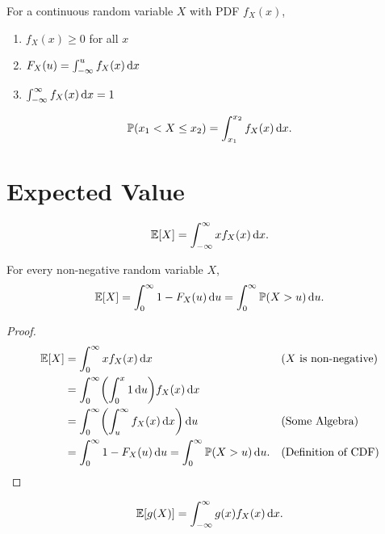 \begin{theorem}
    For a continuous random variable $X$ with \textnormal{PDF} $f_X(x)$,
    \begin{enumerate}
        \item $f_X(x)\geq 0$ for all $x$
        \item $F_X(u)=\int_{-\infty}^u f_X(x)\mathop{}\!\mathrm{d} x$
        \item $\int_{-\infty}^{\infty} f_X(x)\mathop{}\!\mathrm{d} x = 1$
    \end{enumerate}
\end{theorem}

\begin{theorem}
    \begin{align*}
        \P{x_1<X\leq x_2}=\int_{x_1}^{x_2}f_X(x)\diff x.
    \end{align*}
\end{theorem}


\section{Expected Value}
\begin{definition}
    \begin{align*}
        \E{X}=\int_{-\infty}^{\infty} xf_X(x) \diff x.
    \end{align*}
\end{definition}

\begin{theorem}
    For every non-negative random variable $X$, \[\E{X}=\int_{0}^{\infty}1-F_X(u)\diff u=\int_{0}^{\infty}\P{X>u}\diff u.\]
\end{theorem}

\begin{proof}
    \begin{align*}
        \E{X}
        &= \int_{0}^{\infty}xf_X(x)\diff x && \text{($X$ is non-negative)} \\
        &= \int_{0}^{\infty}\parens*{\int_{0}^{x} 1 \diff u} f_X(x)\diff x \\
        &= \int_{0}^{\infty}\parens*{\int_{u}^{\infty}f_X(x)\diff x}\diff u && \text{(Some Algebra)}\\
        &= \int_{0}^{\infty}1-F_X(u)\diff u = \int_{0}^{\infty}\P{X>u}\diff u. && \text{(Definition of CDF)}
    \end{align*}
\end{proof}

\begin{theorem}
    \begin{align*}
        \E{g(X)} = \int_{-\infty}^{\infty} g(x)f_X(x)\diff x.
    \end{align*}
\end{theorem}

